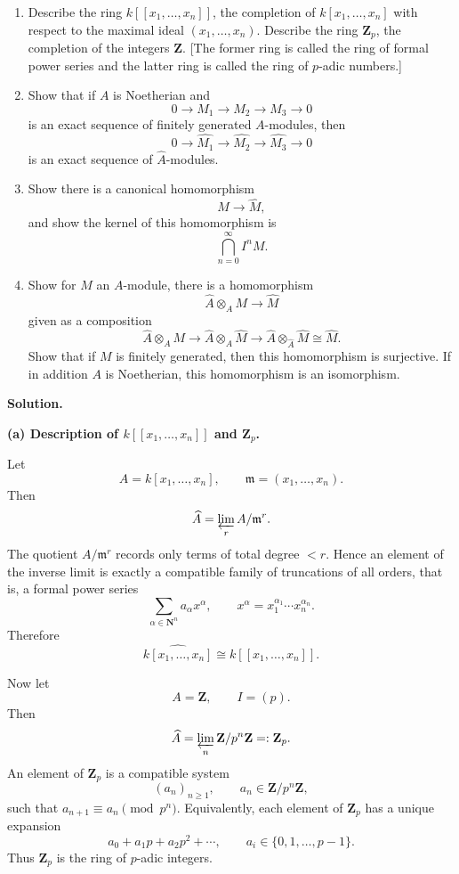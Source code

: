 \documentclass[12pt,a4paper]{article}
\theoremstyle{plain}
\theoremstyle{definition}      %
\begin{document}
\begin{enumerate}
	\item[(a)] Describe the ring \(k[[x_1,\dots,x_n]]\), the completion of \(k[x_1,\dots,x_n]\) with respect to the maximal ideal \((x_1,\dots,x_n)\). Describe the ring \(\mathbf Z_p\), the completion of the integers \(\mathbf Z\). [The former ring is called the ring of formal power series and the latter ring is called the ring of \(p\)-adic numbers.]
	
	\item[(b)] Show that if \(A\) is Noetherian and
	\[
	0 \to M_1 \to M_2 \to M_3 \to 0
	\]
	is an exact sequence of finitely generated \(A\)-modules, then
	\[
	0 \to \widehat{M_1} \to \widehat{M_2} \to \widehat{M_3} \to 0
	\]
	is an exact sequence of \(\widehat{A}\)-modules.
	
	\item[(c)] Show there is a canonical homomorphism
	\[
	M \to \widehat{M},
	\]
	and show the kernel of this homomorphism is
	\[
	\bigcap_{n=0}^{\infty} I^nM.
	\]
	
	\item[(d)] Show for \(M\) an \(A\)-module, there is a homomorphism
	\[
	\widehat{A}\otimes_A M \to \widehat{M}
	\]
	given as a composition
	\[
	\widehat{A}\otimes_A M \to \widehat{A}\otimes_A \widehat{M}
	\to \widehat{A}\otimes_{\widehat{A}}\widehat{M}\cong \widehat{M}.
	\]
	Show that if \(M\) is finitely generated, then this homomorphism is surjective. If in addition \(A\) is Noetherian, this homomorphism is an isomorphism.
\end{enumerate}

\bigskip
\textbf{Solution.}

\textbf{(a) Description of \(k[[x_1,\dots,x_n]]\) and \(\mathbf Z_p\).}

Let
\[
A = k[x_1,\dots,x_n], \qquad \mathfrak m = (x_1,\dots,x_n).
\]
Then
\[
\widehat{A} = \varprojlim_r A/\mathfrak m^r.
\]
The quotient \(A/\mathfrak m^r\) records only terms of total degree \(<r\). Hence an element of the inverse limit is exactly a compatible family of truncations of all orders, that is, a formal power series
\[
\sum_{\alpha\in \mathbf N^n} a_\alpha x^\alpha,
\qquad x^\alpha = x_1^{\alpha_1}\cdots x_n^{\alpha_n}.
\]
Therefore
\[
\widehat{k[x_1,\dots,x_n]} \cong k[[x_1,\dots,x_n]].
\]

Now let
\[
A=\mathbf Z,\qquad I=(p).
\]
Then
\[
\widehat{A}=\varprojlim_n \mathbf Z/p^n\mathbf Z =: \mathbf Z_p.
\]
An element of \(\mathbf Z_p\) is a compatible system
\[
(a_n)_{n\ge 1}, \qquad a_n\in \mathbf Z/p^n\mathbf Z,
\]
such that \(a_{n+1}\equiv a_n \pmod{p^n}\). Equivalently, each element of \(\mathbf Z_p\) has a unique expansion
\[
a_0+a_1p+a_2p^2+\cdots,
\qquad a_i\in \{0,1,\dots,p-1\}.
\]
Thus \(\mathbf Z_p\) is the ring of \(p\)-adic integers.
\end{document}
